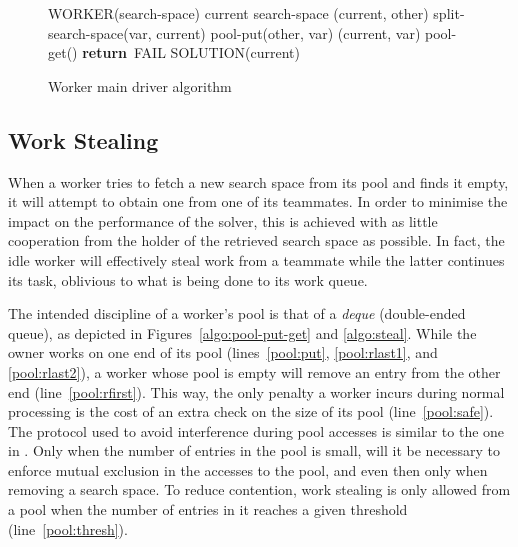 \documentclass{llncs}
\newcommand{\RETURN}{\textbf{\sffamily return}}
\begin{document}
\begin{figure}[h]
  \sffamily

  \begin{algorithmic}[1]
    \PROC WORKER(search-space)
      \State current  search-space
           \label{worker:sel}
        \State (current, other)  split-search-space(var, current)
                                                            \label{worker:split}
        \State pool-put(other, var)                         \label{worker:put}
                                                            \label{worker:prop}
          \State (current, var)  pool-get()     \label{worker:get}
            \State \RETURN\ FAIL                            \label{worker:fail}
          \EndIf
        \EndWhile
      \EndWhile
      \State \Return SOLUTION(current)                      \label{worker:sol}
    \CORP
  \end{algorithmic}

  \rmfamily
  \caption{Worker main driver algorithm}
  \label{algo:worker}
\end{figure}

\subsection{Work Stealing}
\label{sec:steal}

When a worker tries to fetch a new search space from its pool and
finds it empty, it will attempt to obtain one from one of its
teammates. In order to minimise the impact on the performance of the
solver, this is achieved with as little cooperation from the holder of
the retrieved search space as possible. In fact, the idle worker will
effectively steal work from a teammate while the latter continues its
task, oblivious to what is being done to its work queue.

The intended discipline of a worker's pool is that of a \emph{deque}
(double-ended queue), as depicted in Figures~\ref{algo:pool-put-get}
and \ref{algo:steal}. While the owner works on one end of its pool
(lines~\ref{pool:put}, \ref{pool:rlast1}, and \ref{pool:rlast2}), a
worker whose pool is empty will remove an entry from the other end
(line~\ref{pool:rfirst}). This way, the only penalty a worker incurs
during normal processing is the cost of an extra check on the size of
its pool (line~\ref{pool:safe}). The protocol used to avoid
interference during pool accesses is similar to the one in
\cite{cilk-5}. Only when the number of entries in the pool is small,
will it be necessary to enforce mutual exclusion in the accesses to
the pool, and even then only when removing a search space. To reduce
contention, work stealing is only allowed from a pool when the number
of entries in it reaches a given threshold (line~\ref{pool:thresh}).
\end{document}

